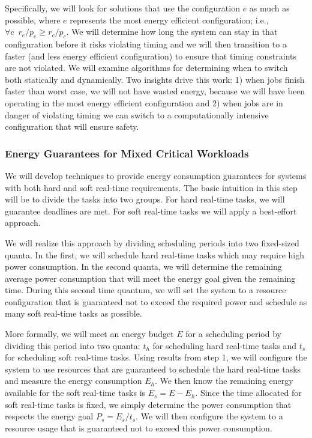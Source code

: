 Specifically, we will look for solutions that use the configuration
$e$ as much as possible, where $e$ represents the most energy
efficient configuration; i.e., $\forall c \,\,\, r_e /p_e \ge
r_c/p_c$.  We will determine how long the system can stay in that
configuration before it risks violating timing and we will then
transition to a faster (and less energy efficient configuration) to
ensure that timing constraints are not violated.  We will examine
algorithms for determining when to switch both statically and
dynamically.  Two insights drive this work: 1) when jobs finish faster
than worst case, we will not have wasted energy, because we will have
been operating in the most energy efficient configuration and 2) when
jobs are in danger of violating timing we can switch to a
computationally intensive configuration that will ensure safety.



\subsubsection{Energy Guarantees for Mixed Critical Workloads}
We will develop techniques to provide energy consumption guarantees
for systems with both hard and soft real-time requirements.  The basic
intuition in this step will be to divide the tasks into two groups.
For hard real-time tasks, we will guarantee deadlines are met.  For
soft real-time tasks we will apply a best-effort approach. 

We will realize this approach by dividing scheduling periods into two
fixed-sized quanta.  In the first, we will schedule hard real-time
tasks which may require high power consumption.  In the second quanta,
we will determine the remaining average power consumption that will
meet the energy goal given the remaining time.  During this second
time quantum, we will set the system to a resource configuration that
is guaranteed not to exceed the required power and schedule as many
soft real-time tasks as possible.

More formally, we will meet an energy budget $E$ for a scheduling
period by dividing this period into two quanta: $t_h$ for scheduling
hard real-time tasks and $t_s$ for scheduling soft real-time tasks.
Using results from step 1, we will configure the system to use
resources that are guaranteed to schedule the hard real-time tasks and
measure the energy consumption $E_h$.  We then know the remaining
energy available for the soft real-time tasks is $E_s = E - E_h$.
Since the time allocated for soft real-time tasks is fixed, we simply
determine the power consumption that respects the energy goal $P_s =
E_s/t_s$.  We will then configure the system to a resource usage that
is guaranteed not to exceed this power consumption.


